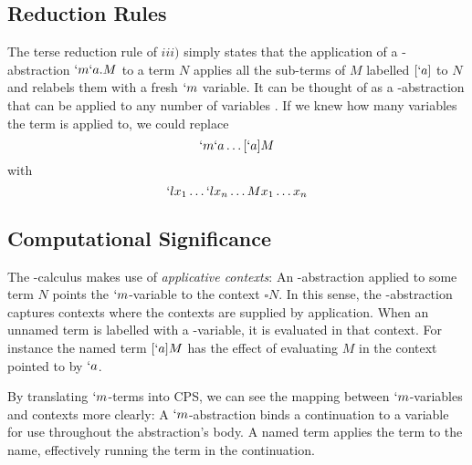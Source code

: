   \subsection{Reduction Rules}
  \begin{figure}[!h]
  \end{figure}

  The terse reduction rule of $iii)$ simply states that the application of a \lmu-abstraction $`m`a.M$ to a term $N$ applies all the sub-terms of $M$ labelled $[`a]$ to $N$ and relabels them with a fresh $`m$ variable.
  It can be thought of as a \lam-abstraction that can be applied to any number of variables \cite{Parigot92}.
  If we knew how many variables the term is applied to, we could replace
  \[ `m`a\dots[`a]M \]
  with 
  \[ `lx_1\dots`lx_n\dots Mx_1\dots x_n \]
  
  \subsection{Computational Significance}

  The \lmu-calculus makes use of \emph{applicative contexts}:
  An \lmu-abstraction applied to some term $N$ points the $`m$-variable to the context $\square N$.
  In this sense, the \lmu-abstraction captures contexts where the contexts are supplied by application.
  When an unnamed term is labelled with a \lmu-variable, it is evaluated in that context. 
  For instance the named term $[`a]M$ has the effect of evaluating $M$ in the context pointed to by $`a$.
  
  By translating $`m$-terms into CPS, we can see the mapping between $`m$-variables and contexts more clearly:
  A $`m$-abstraction binds a continuation to a variable for use throughout the abstraction's body.
  A named term applies the term to the name, effectively running the term in the continuation.
  
